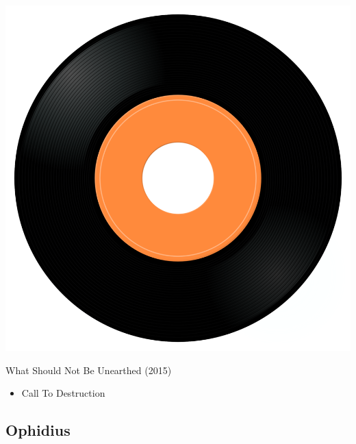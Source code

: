 \begin{minipage}[t]{0.25\textwidth}\vspace{0pt}
\captionsetup{type=figure}
\includegraphics[width=\textwidth]{Images/cover.png}
\caption*{What Should Not Be Unearthed (2015)}
\end{minipage}
\begin{minipage}[t]{0.25\textwidth}\vspace{0pt}
\begin{itemize}[nosep,leftmargin=1em,labelwidth=*,align=left]
	\setlength{\itemsep}{0pt}
	\item Call To Destruction
\end{itemize}
\end{minipage}

\subsection{Ophidius}

